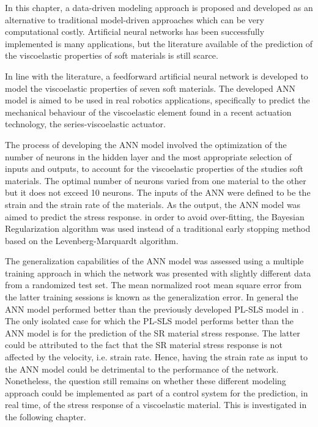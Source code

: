 
In this chapter, a data-driven modeling approach is proposed and developed as an alternative to traditional model-driven approaches which can be very computational costly. Artificial neural networks has been successfully implemented is many applications, but the literature available of the prediction of the viscoelastic properties of soft materials is still scarce. 

In line with the literature, a feedforward artificial neural network is developed to model the viscoelastic properties of seven soft materials. The developed ANN model is aimed to be used in real robotics applications, specifically to predict the mechanical behaviour of the viscoelastic element found in a recent actuation technology, the series-viscoelastic actuator.

The process of developing the ANN model involved the optimization of the number of neurons in the hidden layer and the most appropriate selection of inputs and outputs, to account for the viscoelastic properties of the studies soft materials. The optimal number of neurons varied from one material to the other but it does not exceed 10 neurons. The inputs of the ANN were defined to be the strain and the strain rate of the materials. As the output, the ANN model was aimed to predict the stress response. in order to avoid over-fitting, the Bayesian Regularization algorithm was used instead of a traditional early stopping method based on the Levenberg-Marquardt algorithm.

The generalization capabilities of the ANN model was assessed using a multiple training approach in which the network was presented with slightly different data from a randomized test set. The mean normalized root mean square error from the latter training sessions is known as the generalization error. In general the ANN model performed better than the previously developed PL-SLS model in . The only isolated case for which the PL-SLS model performs better than the ANN model is for the prediction of the SR material stress response. The latter could be attributed to the fact that the SR material stress response is not affected by the velocity, i.e. strain rate. Hence, having the strain rate as input to the ANN model could be detrimental to the performance of the network. Nonetheless, the question still remains on whether these different modeling approach could be implemented as part of a control system for the prediction, in real time, of the stress response of a viscoelastic material. This is investigated in the following chapter.